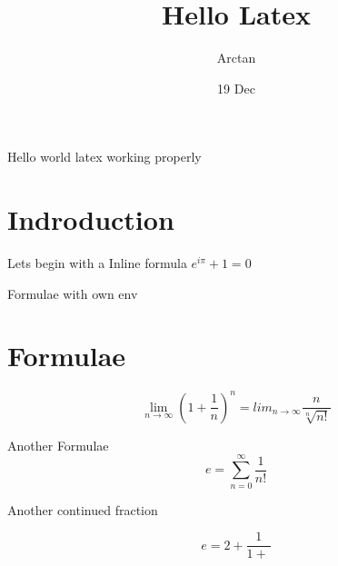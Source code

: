 \documentclass{article}
\title{Hello Latex}
\author{Arctan}
\date{19 Dec}
\begin{document}
    \maketitle
    Hello world  latex working properly
    \section{Indroduction}

    Lets begin with a Inline formula $e^{i\pi} + 1 =0$

Formulae with own env
    \section{Formulae}
    $$ \lim_{n\to\infty} \left(1+\frac{1}{n}\right)^n = lim_{n\to\infty}\frac{n}{\sqrt[n]{n!}} $$

    Another Formulae
    $$e = \sum_{n=0}^{\infty}\frac{1}{n!}$$
    
    Another continued fraction

    $$e = 2+\frac{1}{1+\frac{}{}}$$
\end{document}
